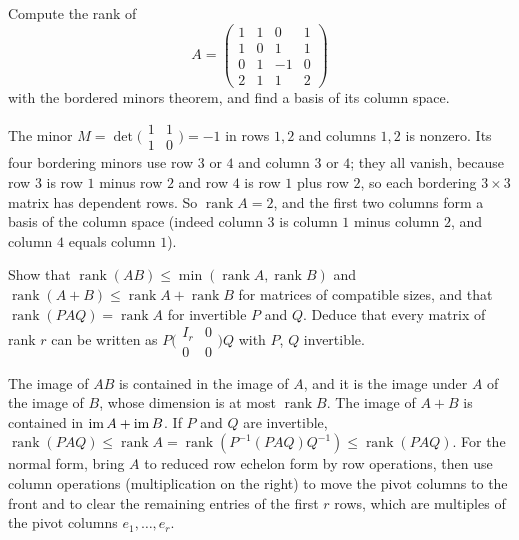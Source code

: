 \begin{exercise}\label{linear-algebra:exercise-bordered-practice}
Compute the rank of
\[
A = \begin{pmatrix}1 & 1 & 0 & 1\\ 1 & 0 & 1 & 1\\ 0 & 1 & -1 & 0\\ 2 & 1 & 1 & 2\end{pmatrix}
\]
with the bordered minors theorem, and find a basis of its column space.
\end{exercise}

\begin{solution}
The minor $M = \det\bigl(\begin{smallmatrix}1 & 1\\ 1 & 0\end{smallmatrix}\bigr) = -1$ in rows $1, 2$ and columns $1, 2$ is nonzero. Its four bordering minors use row $3$ or $4$ and column $3$ or $4$; they
all vanish, because row $3$ is row $1$ minus row $2$ and row $4$ is row $1$ plus row $2$, so each bordering $3 \times 3$ matrix has dependent rows. So $\operatorname{rank}A = 2$, and the first two columns
form a basis of the column space (indeed column $3$ is column $1$ minus column $2$, and column $4$ equals column $1$).
\end{solution}

\begin{exercise}\label{linear-algebra:exercise-rank-inequalities}
Show that $\operatorname{rank}(AB) \leq \min(\operatorname{rank}A, \operatorname{rank}B)$ and $\operatorname{rank}(A + B) \leq \operatorname{rank}A + \operatorname{rank}B$ for matrices of compatible sizes,
and that $\operatorname{rank}(PAQ) = \operatorname{rank}A$ for invertible $P$ and $Q$. Deduce that every matrix of rank $r$ can be written as $P\bigl(\begin{smallmatrix}I_r & 0\\ 0 & 0\end{smallmatrix}\bigr)Q$
with $P$, $Q$ invertible.
\end{exercise}

\begin{solution}
The image of $AB$ is contained in the image of $A$, and it is the image under $A$ of the image of $B$, whose dimension is at most $\operatorname{rank}B$. The image of $A + B$ is contained in
$\operatorname{im} A + \operatorname{im} B$. If $P$ and $Q$ are invertible, $\operatorname{rank}(PAQ) \leq \operatorname{rank}A = \operatorname{rank}(P^{-1}(PAQ)Q^{-1}) \leq \operatorname{rank}(PAQ)$. For the normal form, bring $A$ to
reduced row echelon form by row operations, then use column operations (multiplication on the right) to move the pivot columns to the front and to clear the remaining entries of the first $r$ rows,
which are multiples of the pivot columns $e_1, \ldots, e_r$.
\end{solution}


